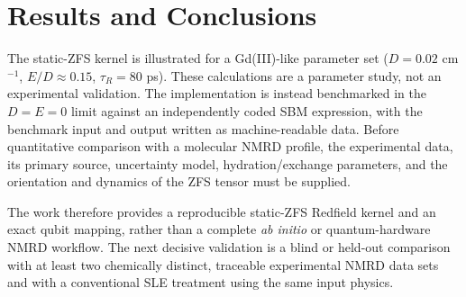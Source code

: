 \documentclass[journal=jctcce,manuscript=article]{achemso}
\begin{document}
\section{Results and Conclusions}
The static-ZFS kernel is illustrated for a Gd(III)-like parameter set ($D=0.02$ cm$^{-1}$, $E/D \approx 0.15$, $\tau_R = 80$ ps). These calculations are a parameter study, not an experimental validation. The implementation is instead benchmarked in the $D=E=0$ limit against an independently coded SBM expression, with the benchmark input and output written as machine-readable data. Before quantitative comparison with a molecular NMRD profile, the experimental data, its primary source, uncertainty model, hydration/exchange parameters, and the orientation and dynamics of the ZFS tensor must be supplied.

The work therefore provides a reproducible static-ZFS Redfield kernel and an exact qubit mapping, rather than a complete \textit{ab initio} or quantum-hardware NMRD workflow. The next decisive validation is a blind or held-out comparison with at least two chemically distinct, traceable experimental NMRD data sets and with a conventional SLE treatment using the same input physics.


\end{document}
